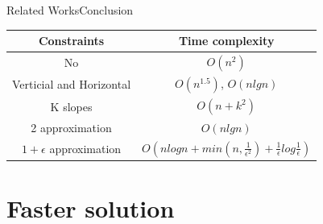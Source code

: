 \documentclass{beamer}
\begin{document}
\begin{frame}{Related Works}{Conclusion} 
    \centering
    \begin{tabular}{|c|c|}
         \hline
         \textbf{Constraints} & \textbf{Time complexity} \\
         \hline
         No & $O(n^2)$ \\
         \hline
         Verticial and Horizontal & $O(n^{1.5})$, $O(nlgn)$ \\
         \hline
         K slopes & $O(n + k^2)$ \\
         \hline
         2 approximation & $O(nlgn)$ \\
         \hline
         $1 + \epsilon$ approximation & $O(nlogn + min(n, \frac{1}{\epsilon^2}) + \frac{1}{\epsilon} log \frac{1}{\epsilon})$\\
         \hline
    \end{tabular}
\end{frame}

\section{Faster solution}
\end{document}
